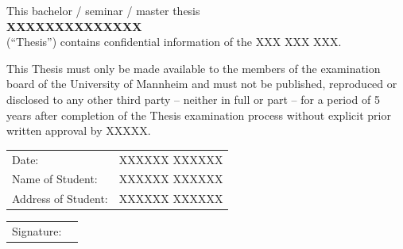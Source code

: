 This bachelor / seminar / master thesis\\
\textbf{XXXXXXXXXXXXXX}\\
(“Thesis”) contains confidential information of the XXX XXX XXX.\\ \vspace{0.5cm}
\raggedright
This Thesis must only be made available to the members of the examination board of the University of Mannheim and must not be published, reproduced or disclosed to any other third party – neither in full or part – for a period of 5 years after completion of the Thesis examination process without explicit prior written approval by XXXXX.\\
\vspace{0.5cm}
\begin{table}[h]
\raggedright
\setlength{\extrarowheight}{.5em}
\begin{tabular}{ll}
Date:               & XXXXXX XXXXXX                        \\
Name of Student:    & XXXXXX XXXXXX                \\
Address of Student: & XXXXXX XXXXXX  
\end{tabular}
\end{table}

\vspace{2.5cm}
\begin{table}[h]
\raggedright
\begin{tabular}{@{}p{.65in}p{2.25in}@{}}
Signature: & \hrulefill
\end{tabular}
\end{table}


\newpage
\renewcommand{\contentsname}{Table of Contents} %



\clearpage \setcounter{page}{2} %
\tableofcontents

\newpage
{}
\listoffigures

\newpage
{}
\listoftables
\newpage



